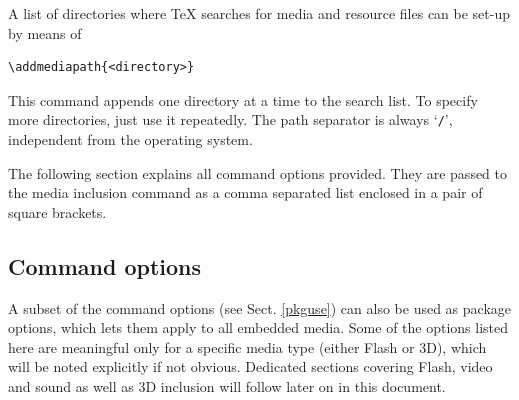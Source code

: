 \documentclass[a4paper]{article}
\begin{document}
A list of directories where \TeX{} searches for media and resource files can be set-up by means of
\begin{verbatim}
\addmediapath{<directory>}
\end{verbatim}
This command appends one directory at a time to the search list. To specify more directories, just use it repeatedly. The path separator is always `\verb+/+', independent from the operating system.

The following section explains all command options provided. They are passed to the media inclusion command as a comma separated list enclosed in a pair of square brackets.

\subsection{Command options}
A subset of the command options (see Sect. \ref{pkguse}) can also be used as package options, which lets them apply to all embedded media. Some of the options listed here are meaningful only for a specific media type (either Flash or 3D), which will be noted explicitly if not obvious. Dedicated sections covering Flash, video and sound as well as 3D inclusion will follow later on in this document.
\end{document}
